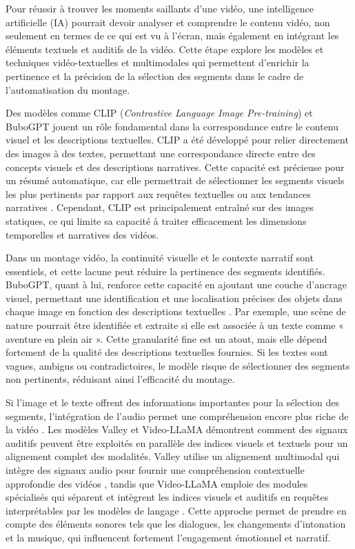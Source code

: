 Pour réussir à trouver les moments saillants d’une vidéo, une intelligence artificielle (IA) pourrait devoir analyser et comprendre le contenu vidéo, non seulement en termes de ce qui est vu à l’écran, mais également en intégrant les éléments textuels et auditifs de la vidéo. Cette étape explore les modèles et techniques vidéo-textuelles et multimodales qui permettent d’enrichir la pertinence et la précision de la sélection des segments dans le cadre de l’automatisation du montage.

Des modèles comme CLIP \cite{bain2022}(\textit{Contrastive Language Image Pre-training}) et BuboGPT \cite{anonymous2023_bubogpt} jouent un rôle fondamental dans la correspondance entre le contenu visuel et les descriptions textuelles. CLIP a été développé pour relier directement des images à des textes, permettant une correspondance directe entre des concepts visuels et des descriptions narratives. Cette capacité est précieuse pour un résumé automatique, car elle permettrait de sélectionner les segments visuels les plus pertinents par rapport aux requêtes textuelles ou aux tendances narratives \cite{chen2023}\cite{ghosh2019_excl}. Cependant, CLIP est principalement entraîné sur des images statiques, ce qui limite sa capacité à traiter efficacement les dimensions temporelles et narratives des vidéos.

Dans un montage vidéo, la continuité visuelle et le contexte narratif sont essentiels, et cette lacune peut réduire la pertinence des segments identifiés. BuboGPT, quant à lui, renforce cette capacité en ajoutant une couche d’ancrage visuel, permettant une identification et une localisation précises des objets dans chaque image en fonction des descriptions textuelles \cite{feng2023}\cite{munasinghe2023_pgvideo}. Par exemple, une scène de nature pourrait être identifiée et extraite si elle est associée à un texte comme « aventure en plein air ». Cette granularité fine est un atout, mais elle dépend fortement de la qualité des descriptions textuelles fournies. Si les textes sont vagues, ambigus ou contradictoires, le modèle risque de sélectionner des segments non pertinents, réduisant ainsi l’efficacité du montage.

Si l’image et le texte offrent des informations importantes pour la sélection des segments, l’intégration de l’audio permet une compréhension encore plus riche de la vidéo \cite{anonymous2023_videollama}\cite{han2024_clip}. Les modèles Valley \cite{anonymous2023_valley} et Video-LLaMA \cite{anonymous2023_videollama} démontrent comment des signaux auditifs peuvent être exploités en parallèle des indices visuels et textuels pour un alignement complet des modalités. Valley utilise un alignement multimodal qui intègre des signaux audio pour fournir une compréhension contextuelle approfondie des vidéos \cite{huang2024_vtimeLLM}, tandis que Video-LLaMA emploie des modules spécialisés qui séparent et intègrent les indices visuels et auditifs en requêtes interprétables par les modèles de langage \cite{xu2024}. Cette approche permet de prendre en compte des éléments sonores tels que les dialogues, les changements d’intonation et la musique, qui influencent fortement l’engagement émotionnel et narratif.


